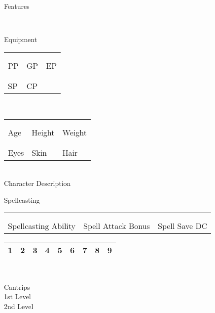 \documentclass[a4paper,10pt,bg=print]{dndbook} %
\begin{document}
	\begin{minipage}[t]{.5\linewidth}\raggedleft\normalsize
		{\LARGE Features}\\
	\end{minipage}\\
	\begin{minipage}[t][\textheight]{.5\linewidth}\normalsize
		{\LARGE Equipment}\\
	\end{minipage}%
	\begin{minipage}[t][\textheight]{.5\linewidth}\normalsize
		\begin{tabularx}{\textwidth}{XXX}
			&&\\&&\\\hline
			\tiny{PP}&\tiny{GP}	&\tiny{EP}\\
			&&\\&&\\\hline
			\tiny{SP}& \tiny{CP}&
		\end{tabularx}\vspace*{7.5cm}\\
		\begin{tabularx}{\textwidth}{XXX}
			&&\\&&\\\hline
			\tiny{Age}	& \tiny{Height}	&\tiny{Weight}\\
			&&\\&&\\\hline
			\tiny{Eyes}	& \tiny{Skin}	&\tiny{Hair}\\
		\end{tabularx}\vspace*{.25cm}\\
		{\LARGE Character Description}\\
	\end{minipage} %
	{\huge Spellcasting}
	\begin{center}\normalsize
		\begin{tabularx}{\textwidth}{XXX}
			&&\\&&\\\hline
			\tiny{Spellcasting Ability}	& \tiny{Spell Attack Bonus}	&\tiny{Spell Save DC}
		\end{tabularx}
		\begin{tabularx}{\linewidth}{XXXXXXXXX}
			1&2&3&4&5&6&7&8&9\\\hline
		\end{tabularx}\vspace*{.75cm}\\
	\end{center}
	\begin{minipage}[t]{.334\linewidth}\scriptsize
		\textcolor{titlered}{\large Cantrips}\vspace*{6cm}\\
		\textcolor{titlered}{\large 1st Level}\vspace*{6cm}\\
		\textcolor{titlered}{\large 2nd Level}\\
	\end{minipage}%
\end{document}
